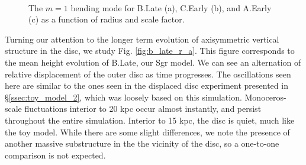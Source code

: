 \begin{figure}
	\centering
	\\
		\caption{The $m=1$ bending mode for B.Late (a), C.Early (b), and A.Early (c) as a function of radius and scale factor. }
\end{figure}



Turning our attention to the longer term evolution of axisymmetric vertical structure in the disc, we study Fig. \ref{fig:b_late_r_a}. This figure corresponds to the mean height evolution of B.Late, our Sgr model. We can see an alternation of relative displacement of the outer disc as time progresses. The oscillations seen here are similar to the ones seen in the displaced disc experiment presented in \S\ref{ssec:toy_model_2}, which was loosely based on this simulation. Monoceros-scale fluctuations interior to 20 kpc occur almost instantly, and persist throughout the entire simulation. Interior to 15 kpc, the disc is quiet, much like the toy model. While there are some slight differences, we note the presence of another massive substructure in the the vicinity of the disc, so a one-to-one comparison is not expected.


